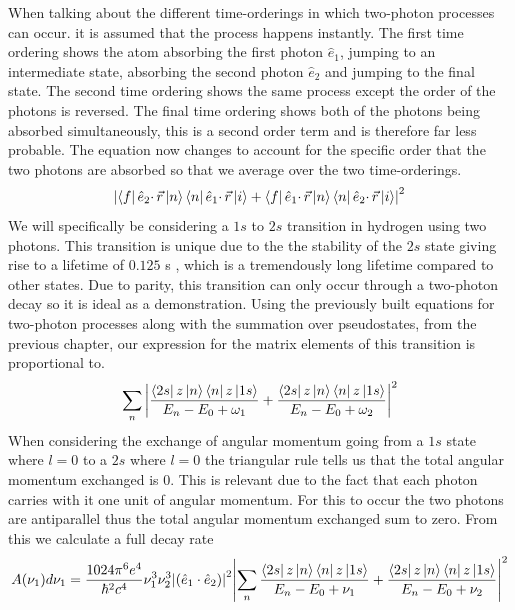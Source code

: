 When talking about the different time-orderings in which two-photon processes can occur. it is assumed that the process happens instantly. The first time ordering shows the atom absorbing the first photon \(\hat{e}_1\), jumping to an intermediate state, absorbing the second photon \(\hat{e}_2\) and jumping to the final state. The second time ordering shows the same process except the order of the photons is reversed. The final time ordering shows both of the photons being absorbed simultaneously, this is a second order term and is therefore far less probable. The equation now changes to account for the specific order that the two photons are absorbed so that we average over the two time-orderings.
\begin{equation}
        \abs{
        \bra{f}\hat{e}_2\cdotp\Vec{r}\ket{n}
        \bra{n}\hat{e}_1\cdotp\Vec{r}\ket{i}
        +
        \bra{f}\hat{e}_1\cdotp\Vec{r}\ket{n}
        \bra{n}\hat{e}_2\cdotp\Vec{r}\ket{i}
        }^{2}
\end{equation}
We will specifically be considering a \(1s\) to \(2s\) transition in hydrogen using two photons. This transition is unique due to the the stability of the \(2s\) state giving rise to a lifetime of \(0.125\) s \cite{lifetime}, which is a tremendously long lifetime compared to other states. Due to parity, this transition can only occur through a two-photon decay so it is ideal as a demonstration. Using the previously built equations for two-photon processes along with the summation over pseudostates, from the previous chapter, our expression for the matrix elements of this transition is proportional to.
\begin{equation}
    \sum_{n} \abs{
    \frac{\bra{2s}z\ket{n}
    \bra{n}z\ket{1s}}
    {E_{n}-E_{0}+\omega_{1}}+
    \frac{\bra{2s}z\ket{n}
    \bra{n}z\ket{1s}}
    {E_{n}-E_{0}+\omega_{2}}
    }^{2}
\end{equation}
When considering the exchange of angular momentum going from a \(1s\) state where \(l=0\) to a \(2s\) where \(l=0\) the triangular rule tells us that the total angular momentum exchanged is 0. This is relevant due to the fact that each photon carries with it one unit of angular momentum. For this to occur the two photons are antiparallel thus the total angular momentum exchanged sum to zero. From this we calculate a full decay rate
\begin{equation}
    A(\nu_1)d\nu_1=\frac{1024\pi^6 e^4}{\hbar^2 c^4}\nu_1^3\nu_2^3
    \abs{(\hat{e}_1 \cdot \hat{e}_2)}^2
    \abs {\sum_{n} 
    \frac{\bra{2s}z\ket{n}
    \bra{n}z\ket{1s}}
    {E_{n}-E_{0}+\nu_{1}}+
    \frac{\bra{2s}z\ket{n}
    \bra{n}z\ket{1s}}
    {E_{n}-E_{0}+\nu_{2}}
    }^{2}
\end{equation}
